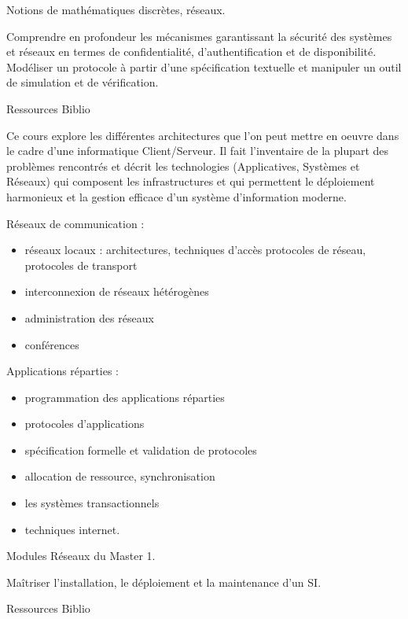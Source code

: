 {Notions de mathématiques discrètes, réseaux.} 
{\begin{itemize} 
  \ObjItem Comprendre en profondeur les mécanismes garantissant la sécurité des
systèmes et réseaux en termes de confidentialité, d'authentification et de
disponibilité.
  \ObjItem Modéliser un protocole à partir d'une spécification textuelle et
manipuler un outil de simulation et de vérification.
\end{itemize} 
} 
{Ressources} 
{Biblio} 
 
\vfill

{
Ce cours explore les différentes architectures que l'on peut mettre en
oeuvre dans le cadre d'une informatique Client/Serveur. Il fait l'inventaire
de la plupart des problèmes rencontrés et décrit les technologies
(Applicatives, Systèmes et Réseaux) qui composent les infrastructures et
qui permettent le déploiement harmonieux et la gestion efficace d'un
système d'information moderne.

Réseaux de communication :
\begin{itemize}
\item réseaux locaux : architectures, techniques d'accès protocoles de réseau, protocoles de transport
\item interconnexion de réseaux hétérogènes
\item administration des réseaux
\item conférences
\end{itemize} 
Applications réparties :
\begin{itemize}
\item programmation des applications réparties
\item protocoles d'applications
\item spécification formelle et validation de protocoles
\item allocation de ressource, synchronisation
\item les systèmes transactionnels
\item techniques internet.
\end{itemize} 
} 
{Modules Réseaux du Master 1.} 
{\begin{itemize} 
  \ObjItem Maîtriser l'installation, le déploiement et la maintenance d'un SI.
\end{itemize} 
} 
{Ressources} 
{Biblio} 
 
